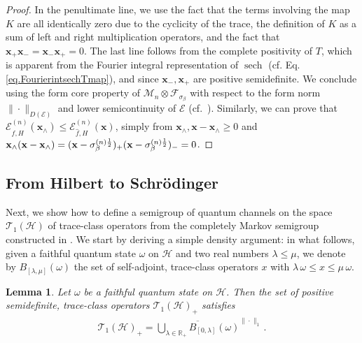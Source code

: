 \documentclass[11pt]{amsart}
\newcommand{\1}{\mathbbm{1}}
\theoremstyle{plain}
\newtheorem{lemma}[theorem]{Lemma}
\theoremstyle{definition}
\theoremstyle{remark}
\numberwithin{equation}{section}
\begin{document}
\begin{proof}
In the penultimate line, we use the fact that the terms involving the map $K$ are all identically zero due to the cyclicity of the trace, the definition of $K$ as a sum of left and right multiplication operators, and the fact that $\mathbf{x}_+\mathbf{x}_-=\mathbf{x}_-\mathbf{x}_+=0$. The last line follows from the complete positivity of $T$, which is apparent from the Fourier integral representation of $\operatorname{sech}$ (cf. Eq. \eqref{eq.FourierintsechTmap}), and since $\mathbf{x}_-,\mathbf{x}_+$ are positive semidefinite. We conclude using the form core property of $\mathscr{M}_n\otimes \mathscr{F}_{\sigma_\beta}$ with respect to the form norm $\|\cdot \|_{D(\mathcal{E})}$
 and lower semicontinuity of $\mathcal{E}$ (cf.~). Similarly, we can prove that $\mathcal{E}_{\widehat{f},H}^{(n)}(\mathbf{x}_\wedge)\le \mathcal{E}_{\widehat{f},H}^{(n)}(\mathbf{x})$, simply from $\mathbf{x}_\wedge,\mathbf{x}-\mathbf{x}_\wedge\ge 0$ and $\mathbf{x}_\wedge (\mathbf{x}-\mathbf{x}_\wedge)=(\mathbf{x}-\sigma_\beta^{\smash{(n)\frac{1}{2}}})_+(\mathbf{x}-\sigma_\beta^{\smash{(n)\frac{1}{2}}})_-=0$.

\end{proof}





\subsection{From Hilbert to Schr\"{o}dinger}\label{appendixHilberttoSchro}


Next, we show how to define a semigroup of quantum channels on the space $\mathscr{T}_1(\mathcal{H})$ of trace-class operators from the completely Markov semigroup constructed in . We start by deriving a simple density argument: in what follows, given a faithful quantum state $\omega$ on $\mathcal{H}$ and two real numbers $\lambda\le  \mu$, we denote by $B_{[\lambda,\mu]}(\omega)$ the set of self-adjoint, trace-class operators $x$ with $\lambda \,\omega \le x\le \mu\,\omega$.

\begin{lemma}\label{densityT1T2}
Let $\omega$ be a faithful quantum state on $\mathcal{H}$. Then the set of positive semidefinite, trace-class operators $\mathscr{T}_1(\mathcal{H})_+$ satisfies
\begin{align*}
\mathscr{T}_1(\mathcal{H})_+=\overline{\bigcup_{\lambda\in\mathbb{R}_+}B_{[0,\lambda]}(\omega)}^{\|\cdot \|_1}\,.
\end{align*}
\end{lemma}
\end{document}
